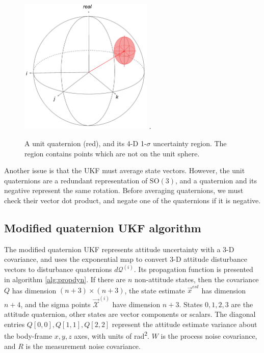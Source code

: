 \documentclass[conference]{IEEEtran}
\begin{document}
\begin{figure}[!t]
  \centering
  \includegraphics[width=2.5in]{figures/quat_uncert_4d.png}
  \DeclareGraphicsExtensions.
  \caption{A unit quaternion (red), and its 4-D 1-$\sigma$ uncertainty region. The region contains points which are not on the unit sphere.}
  \label{fig:quat_uncert_4d}
\end{figure}

Another issue is that the UKF must average state vectors. However, the unit quaternions are a redundant representation of $\mathrm{SO(3)}$, and a quaternion and its negative represent the same rotation. Before averaging quaternions, we must check their vector dot product, and negate one of the quaternions if it is negative.\\

\subsection{Modified quaternion UKF algorithm}
The modified quaternion UKF \cite{1257247} represents attitude uncertainty with a 3-D covariance, and uses the exponential map to convert 3-D attitude disturbance vectors to disturbance quaternions $d\mathcal{Q}^{(i)}$. Its propagation function is presented in algorithm \ref{alg:propdyn}. If there are $n$ non-attitude states, then the covariance $Q$ has dimension $(n+3) \times (n+3)$, the state estimate $\vec{x}^{est}$ has dimension $n+4$, and the sigma points $\vec{\mathcal{X}}^{(i)}$ have dimension $n+3$. States $0, 1, 2, 3$ are the attitude quaternion, other states are vector components or scalars. The diagonal entries $Q[0,0], Q[1,1], Q[2,2]$ represent the attitude estimate variance about the body-frame $x,y,z$ axes, with units of \si{\radian\squared}. $W$ is the process noise covariance, and $R$ is the measurement noise covariance.\\
\end{document}
